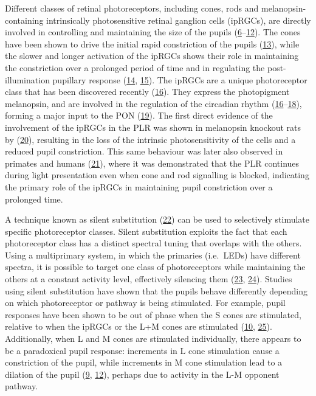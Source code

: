 \documentclass[
]{article}
\begin{document}
Different classes of retinal photoreceptors, including cones, rods and melanopsin-containing intrinsically photosensitive retinal ganglion cells (ipRGCs), are directly involved in controlling and maintaining the size of the pupils (\protect\hyperlink{ref-Barrionuevo2014}{6}--\protect\hyperlink{ref-Woelders2018}{12}). The cones have been shown to drive the initial rapid constriction of the pupils (\protect\hyperlink{ref-Mathot2018}{13}), while the slower and longer activation of the ipRGCs shows their role in maintaining the constriction over a prolonged period of time and in regulating the post-illumination pupillary response (\protect\hyperlink{ref-Markwell2010}{14}, \protect\hyperlink{ref-McDougal2010}{15}). The ipRGCs are a unique photoreceptor class that has been discovered recently (\protect\hyperlink{ref-Provencio2000}{16}). They express the photopigment melanopsin, and are involved in the regulation of the circadian rhythm (\protect\hyperlink{ref-Provencio2000}{16}--\protect\hyperlink{ref-Ruby2002}{18}), forming a major input to the PON (\protect\hyperlink{ref-Dacey2003}{19}). The first direct evidence of the involvement of the ipRGCs in the PLR was shown in melanopsin knockout rats by (\protect\hyperlink{ref-Lucas2003}{20}), resulting in the loss of the intrinsic photosensitivity of the cells and a reduced pupil constriction. This same behaviour was later also observed in primates and humans (\protect\hyperlink{ref-Gamlin2007}{21}), where it was demonstrated that the PLR continues during light presentation even when cone and rod signalling is blocked, indicating the primary role of the ipRGCs in maintaining pupil constriction over a prolonged time.

A technique known as silent substitution (\protect\hyperlink{ref-Estevez1982}{22}) can be used to selectively stimulate specific photoreceptor classes. Silent substitution exploits the fact that each photoreceptor class has a distinct spectral tuning that overlaps with the others. Using a multiprimary system, in which the primaries (i.e.~LEDs) have different spectra, it is possible to target one class of photoreceptors while maintaining the others at a constant activity level, effectively silencing them (\protect\hyperlink{ref-Shapiro1996}{23}, \protect\hyperlink{ref-Spitschan2018}{24}). Studies using silent substitution have shown that the pupils behave differently depending on which photoreceptor or pathway is being stimulated. For example, pupil responses have been shown to be out of phase when the S cones are stimulated, relative to when the ipRGCs or the L+M cones are stimulated (\protect\hyperlink{ref-Spitschan2014}{10}, \protect\hyperlink{ref-Cao2015}{25}). Additionally, when L and M cones are stimulated individually, there appears to be a paradoxical pupil response: increments in L cone stimulation cause a constriction of the pupil, while increments in M cone stimulation lead to a dilation of the pupil (\protect\hyperlink{ref-Murray2018}{9}, \protect\hyperlink{ref-Woelders2018}{12}), perhaps due to activity in the L-M opponent pathway.
\end{document}
